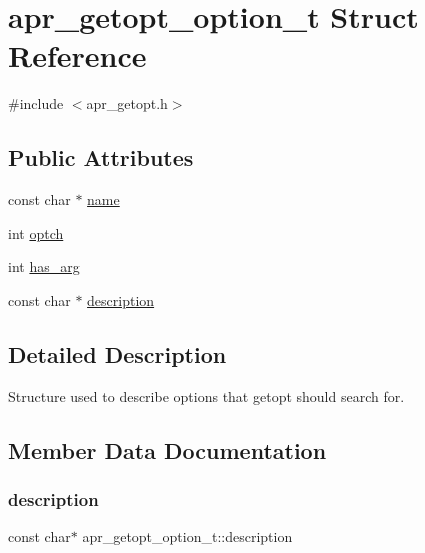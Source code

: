 \hypertarget{structapr__getopt__option__t}{}\section{apr\+\_\+getopt\+\_\+option\+\_\+t Struct Reference}
\label{structapr__getopt__option__t}


{\ttfamily \#include $<$apr\+\_\+getopt.\+h$>$}

\subsection*{Public Attributes}
\begin{DoxyCompactItemize}
\item 
const char $\ast$ \mbox{\hyperlink{structapr__getopt__option__t_a7e623913c9761495c5d37adf6ff1ee69}{name}}
\item 
int \mbox{\hyperlink{structapr__getopt__option__t_a476e67c4dde620fe5b4f5952238c6e94}{optch}}
\item 
int \mbox{\hyperlink{structapr__getopt__option__t_aac65dae93f6d35f4848b91f6f9d66278}{has\+\_\+arg}}
\item 
const char $\ast$ \mbox{\hyperlink{structapr__getopt__option__t_a8fd515c0a9e621f6c0d058772429ab98}{description}}
\end{DoxyCompactItemize}


\subsection{Detailed Description}
Structure used to describe options that getopt should search for. 

\subsection{Member Data Documentation}
\mbox{\label{structapr__getopt__option__t_a8fd515c0a9e621f6c0d058772429ab98}} 
\subsubsection{\texorpdfstring{description}{description}}
{\footnotesize\ttfamily const char$\ast$ apr\+\_\+getopt\+\_\+option\+\_\+t\+::description}

